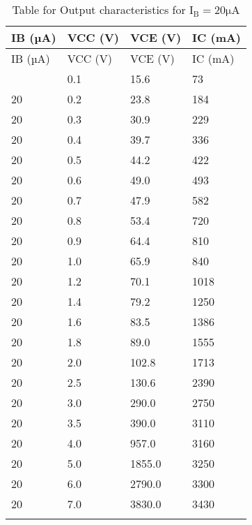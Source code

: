 \documentclass[12pt]{article}
\begin{document}
\begin{longtable}{|l|l|l|l|}
	\hline
    IB (µA) & VCC (V) & VCE (V) & IC (mA) \\ \hline
	\endfirsthead
	\hline
    IB (µA) & VCC (V) & VCE (V) & IC (mA) \\ \hline
	\endhead
	\hline
	\endfoot
	\endlastfoot
    20  & 0.1  & 15.6  & 73   \\ \hline
    20  & 0.2  & 23.8  & 184  \\ \hline
    20  & 0.3  & 30.9  & 229  \\ \hline
    20  & 0.4  & 39.7  & 336  \\ \hline
    20  & 0.5  & 44.2  & 422  \\ \hline
    20  & 0.6  & 49.0  & 493  \\ \hline
    20  & 0.7  & 47.9  & 582  \\ \hline
    20  & 0.8  & 53.4  & 720  \\ \hline
    20  & 0.9  & 64.4  & 810  \\ \hline
    20  & 1.0  & 65.9  & 840  \\ \hline
    20  & 1.2  & 70.1  & 1018 \\ \hline
    20  & 1.4  & 79.2  & 1250 \\ \hline
    20  & 1.6  & 83.5  & 1386 \\ \hline
    20  & 1.8  & 89.0  & 1555 \\ \hline
    20  & 2.0  & 102.8 & 1713 \\ \hline
    20  & 2.5  & 130.6 & 2390 \\ \hline
    20  & 3.0  & 290.0 & 2750 \\ \hline
    20  & 3.5  & 390.0 & 3110 \\ \hline
    20  & 4.0  & 957.0 & 3160 \\ \hline
    20  & 5.0  & 1855.0 & 3250 \\ \hline
    20  & 6.0  & 2790.0 & 3300 \\ \hline
    20  & 7.0  & 3830.0 & 3430 \\ \hline
\caption{Table for Output characteristics for $\mathrm{I_B=20 \mu A}$}
\end{longtable}
\end{document}
